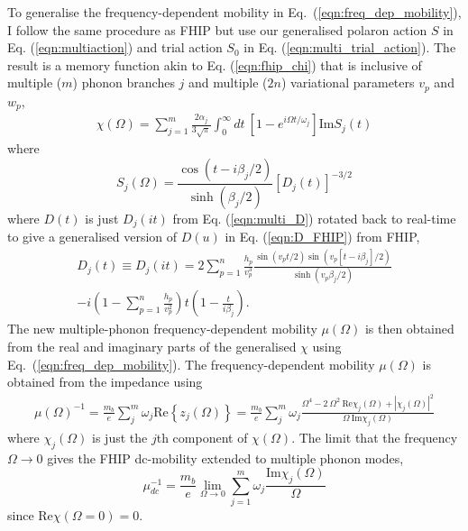 To generalise the frequency-dependent mobility in Eq.~(\ref{eqn:freq_dep_mobility}), I follow the same procedure as FHIP but use our generalised polaron action $S$ in Eq. (\ref{eqn:multiaction}) and trial action $S_0$ in Eq. (\ref{eqn:multi_trial_action}). The result is a memory function akin to Eq. (\ref{eqn:fhip_chi}) that is inclusive of multiple ($m$) phonon branches $j$ and multiple ($2n$) variational parameters $v_{p}$ and $w_{p}$,
\begin{equation} \label{eqn:multi_memory}
    \begin{gathered}
        \chi(\Omega) = \sum_{j=1}^m \frac{2\alpha_j}{3\sqrt{\pi}} \int_0^{\infty} dt\ \left[1 - e^{i\Omega t / \omega_j}\right] \textrm{Im} S_j(t)
    \end{gathered}
\end{equation}
where
\begin{equation}
    S_j(\Omega) = \frac{\cos \left(t - i\beta_j/2\right)}{\sinh (\beta_j/2)} [D_j(t)]^{-3/2}
\end{equation}
where $D(t)$ is just $D_j(it)$ from Eq. (\ref{eqn:multi_D}) rotated back to real-time to give a generalised version of $D(u)$ in Eq. (\ref{eqn:D_FHIP}) from FHIP,
\begin{equation}
    \begin{gathered}
        D_j(t) \equiv D_j(it) = 2\sum_{p=1}^n \frac{h_p}{v_{p}^3} \frac{\sin(v_{p} t/2) \sin(v_{p}[t-i\beta_j]/2)}{\sinh(v_{p}\beta_j/2)} \\
        -i \left(1-\sum_{p=1}^n\frac{h_{p}}{v_{p}^2}\right) t \left(1 - \frac{t}{i\beta_j}\right).
    \end{gathered}
\end{equation}
The new multiple-phonon frequency-dependent mobility $\mu(\Omega)$ is then obtained from the real and imaginary parts of the generalised $\chi$ using Eq.~(\ref{eqn:freq_dep_mobility}). The frequency-dependent mobility $\mu(\Omega)$ is obtained from the impedance using
\begin{equation}\label{eqn:freq_dep_mobility}
\begin{gathered}
    \mu(\Omega)^{-1} = \frac{m_b}{e} \sum_j^m \omega_j \textrm{Re}\left\{z_j(\Omega)\right\}
    = \frac{m_b}{e} \sum_j^m \omega_j \frac{\Omega^4 - 2\ \Omega^2\  \textrm{Re}\chi_j(\Omega) + |\chi_j(\Omega)|^2}{\Omega\ \textrm{Im}\chi_j(\Omega)}
    \end{gathered}
\end{equation}
where $\chi_j(\Omega)$ is just the $j$th component of $\chi(\Omega)$. The limit that the frequency $\Omega \rightarrow 0$ gives the FHIP dc-mobility extended to multiple phonon modes,
\begin{equation}
    \mu^{-1}_{dc} = \frac{m_b}{e}\lim_{\Omega \rightarrow 0} \sum_{j=1}^m \omega_j \frac{\textrm{Im}\chi_j(\Omega)}{\Omega}
\end{equation}
since $\textrm{Re}\chi(\Omega = 0) = 0$.

